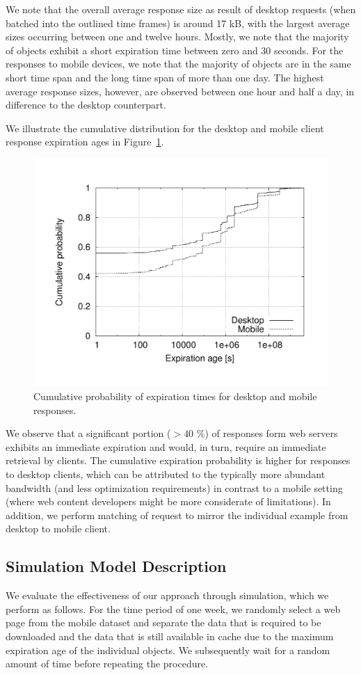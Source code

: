 \documentclass[letterpaper,conference]{IEEEtran}
\begin{document}
We note that the overall average response size as result of desktop requests (when batched into the outlined time frames) is around 17 kB, with the largest average sizes occurring between one and twelve hours.
Mostly, we note that the majority of objects exhibit a short expiration time between zero and 30 seconds.
For the responses to mobile devices, we note that the majority of objects are in the same short time span and the long time span of more than one day.
The highest average response sizes, however, are observed between one hour and half a day, in difference to the desktop counterpart.

We illustrate the cumulative distribution for the desktop and mobile client response expiration ages in Figure~\ref{fig:comp_cpd}.
\begin{figure}
	\centering
	\includegraphics[width=.925\linewidth]{comp_cpd}
	\caption{Cumulative probability of expiration times for desktop and mobile responses.}
	\label{fig:comp_cpd}
\end{figure}
We observe that a significant portion ($>40$ \%) of responses form web servers exhibits an immediate expiration and would, in turn, require an immediate retrieval by clients.
The cumulative expiration probability is higher for responses to desktop clients, which can be attributed to the typically more abundant bandwidth (and less optimization requirements) in contrast to a mobile setting (where web content developers might be more considerate of limitations).
In addition, we perform matching of request to mirror the individual example from desktop to mobile client. 


\subsection{Simulation Model Description}
We evaluate the effectiveness of our approach through simulation, which we perform as follows.
For the time period of one week, we randomly select a web page from the mobile dataset and separate the data that is required to be downloaded and the data that is still available in cache due to the maximum expiration age of the individual objects. We subsequently wait for a random amount of time before repeating the procedure.
\end{document}
